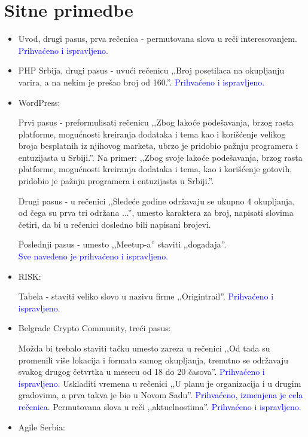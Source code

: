 \documentclass[a4paper]{report}
\newcommand{\odgovor}[1]{\textcolor{blue}{#1}}
\begin{document}
\section{Sitne primedbe}
\begin{itemize}
    \item Uvod, drugi pasus, prva rečenica - permutovana slova u reči interesovanjem.
    \odgovor{Prihvaćeno i ispravljeno.}
    \item PHP Srbija, drugi pasus - uvući rečenicu ,,Broj posetilaca na okupljanju varira, a na nekim je prešao broj od 160.''. 
    \odgovor{Prihvaćeno i ispravljeno.}
    \item WordPress:
    
    Prvi pasus - preformulisati rečenicu ,,Zbog lakoće podešavanja, brzog rasta platforme, mogućnosti kreiranja dodataka i tema kao i korišćenje velikog broja besplatnih iz njihovog marketa, ubrzo je pridobio pažnju programera i entuzijasta u Srbiji.''. Na primer: ,,Zbog svoje lakoće podešavanja, brzog rasta platforme, mogućnosti kreiranja dodataka i tema, kao i korišćenje gotovih, pridobio je pažnju programera i  entuzijasta u Srbiji.''. 
    
    Drugi pasus - u rečenici ,,Sledeće godine održavaju se ukupno 4 okupljanja, od čega su prva tri održana ...'', umesto karaktera za broj, napisati slovima četiri, da bi u rečenici dosledno bili napisani brojevi.
    
     Poslednji pasus - umesto ,,Meetup-a'' staviti ,,događaja''. \\
     \odgovor{Sve navedeno je prihvaćeno i ispravljeno.}
    \item RISK:
    
    Tabela - staviti veliko slovo u nazivu firme ,,Origintrail''.
    \odgovor{Prihvaćeno i ispravljeno.}
    
    \item Belgrade Crypto Community, treći pasus:
    
    Možda bi trebalo staviti tačku umesto zareza u rečenici ,,Od tada su promenili više lokacija i formata samog okupljanja, trenutno se održavaju svakog drugog četvrtka u mesecu od 18 do 20 časova''.
    \odgovor{Prihvaćeno i ispravljeno.}
    Uskladiti vremena u rečenici ,,U planu je organizacija i u drugim gradovima, a prva takva je bio u Novom Sadu''.
    \odgovor{Prihvaćeno, izmenjena je cela rečenica.}
    Permutovana slova u reči ,,aktuelnostima''.
    \odgovor{Prihvaćeno i ispravljeno.}
    \item Agile Serbia:
    

\end{itemize}
\end{document}
